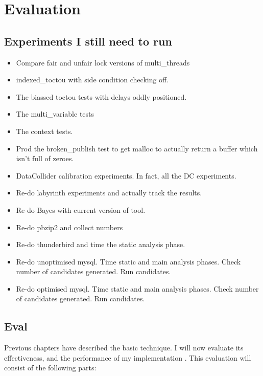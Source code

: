 \chapter{Evaluation}
\label{chapter:eval}

\section{Experiments I still need to run}

\begin{itemize}
\item Compare fair and unfair lock versions of multi\_threads
\item indexed\_toctou with side condition checking off.
\item The biassed toctou tests with delays oddly positioned.
\item The multi\_variable tests
\item The context tests.
\item Prod the broken\_publish test to get malloc to actually
  return a buffer which isn't full of zeroes.
\item DataCollider calibration experiments.  In fact, all the DC
  experiments.
\item Re-do labyrinth experiments and actually track the results.
\item Re-do Bayes with current version of tool.
\item Re-do pbzip2 and collect numbers
\item Re-do thunderbird and time the static analysis phase.
\item Re-do unoptimised mysql.  Time static and main analysis phases.
  Check number of candidates generated.  Run candidates.
\item Re-do optimised mysql.  Time static and main analysis phases.
  Check number of candidates generated.  Run candidates.
\end{itemize}

\section{Eval}

Previous chapters have described the basic {\technique} technique.  I
will now evaluate its effectiveness, and the performance of my
implementation {\implementation}.  This evaluation will consist of the
following parts:

